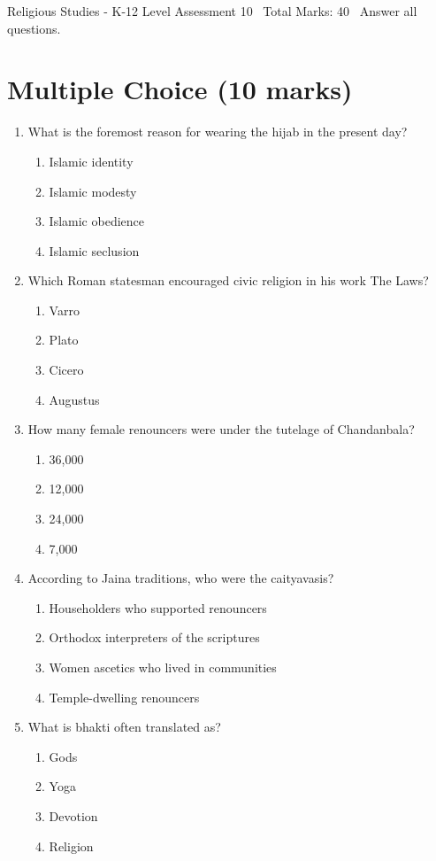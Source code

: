 \documentclass[12pt]{article}
\begin{document}
\begin{center}
Religious Studies - K-12 Level Assessment 10 \
Total Marks: 40 \
Answer all questions.
\end{center}

\section*{Multiple Choice (10 marks)}
\begin{enumerate}[label=\arabic*.]
\item What is the foremost reason for wearing the hijab in the present day?
\begin{enumerate}[label=(\alph*)]
    \item Islamic identity
    \item Islamic modesty
    \item Islamic obedience
    \item Islamic seclusion
\end{enumerate}
\item Which Roman statesman encouraged civic religion in his work The Laws?
\begin{enumerate}[label=(\alph*)]
    \item Varro
    \item Plato
    \item Cicero
    \item Augustus
\end{enumerate}
\item How many female renouncers were under the tutelage of Chandanbala?
\begin{enumerate}[label=(\alph*)]
    \item 36,000
    \item 12,000
    \item 24,000
    \item 7,000
\end{enumerate}
\item According to Jaina traditions, who were the caityavasis?
\begin{enumerate}[label=(\alph*)]
    \item Householders who supported renouncers
    \item Orthodox interpreters of the scriptures
    \item Women ascetics who lived in communities
    \item Temple-dwelling renouncers
\end{enumerate}
\item What is bhakti often translated as?
\begin{enumerate}[label=(\alph*)]
    \item Gods
    \item Yoga
    \item Devotion
    \item Religion
\end{enumerate}
\end{enumerate}
\end{document}
